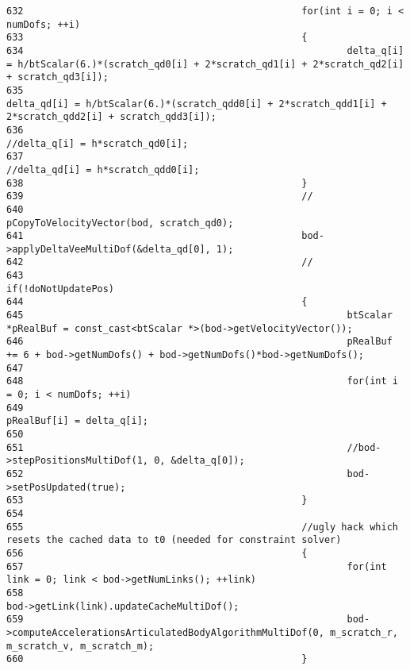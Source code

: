 \begin{Code}
\begin{verbatim}
632                                                 for(int i = 0; i < numDofs; ++i)
633                                                 {
634                                                         delta_q[i] = h/btScalar(6.)*(scratch_qd0[i] + 2*scratch_qd1[i] + 2*scratch_qd2[i] + scratch_qd3[i]);
635                                                         delta_qd[i] = h/btScalar(6.)*(scratch_qdd0[i] + 2*scratch_qdd1[i] + 2*scratch_qdd2[i] + scratch_qdd3[i]);                                                       
636                                                         //delta_q[i] = h*scratch_qd0[i];
637                                                         //delta_qd[i] = h*scratch_qdd0[i];
638                                                 }
639                                                 //
640                                                 pCopyToVelocityVector(bod, scratch_qd0);
641                                                 bod->applyDeltaVeeMultiDof(&delta_qd[0], 1);                                            
642                                                 //
643                                                 if(!doNotUpdatePos)
644                                                 {
645                                                         btScalar *pRealBuf = const_cast<btScalar *>(bod->getVelocityVector());
646                                                         pRealBuf += 6 + bod->getNumDofs() + bod->getNumDofs()*bod->getNumDofs();
647 
648                                                         for(int i = 0; i < numDofs; ++i)
649                                                                 pRealBuf[i] = delta_q[i];
650 
651                                                         //bod->stepPositionsMultiDof(1, 0, &delta_q[0]);
652                                                         bod->setPosUpdated(true);                                                       
653                                                 }
654 
655                                                 //ugly hack which resets the cached data to t0 (needed for constraint solver)
656                                                 {
657                                                         for(int link = 0; link < bod->getNumLinks(); ++link)
658                                                                 bod->getLink(link).updateCacheMultiDof();
659                                                         bod->computeAccelerationsArticulatedBodyAlgorithmMultiDof(0, m_scratch_r, m_scratch_v, m_scratch_m);
660                                                 }

\end{verbatim}
\end{Code}
